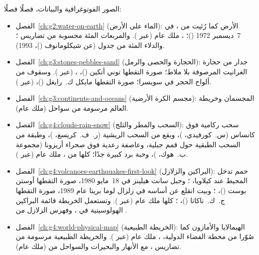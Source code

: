 \bigskip
\noindent الصور الفوتوغرافية والبيانات، فصلًا فصلًا:
\begin{itemize}\small
  \item الفصل~\ref{ch:g2:water-on-earth} (الماء على الأرض): الأرض كما رُئيت من ، في 7~ديسمبر 1972 ()؛ ، ملك عام (عبر ). والمربعات المئة محسوبة من تضاريس ؛ والدلاء المئة من جدول  (عن شيكلومانوف ()، 1993).
  \item الفصل~\ref{ch:g3:stones-pebbles-sand} (الحجارة والحصى والرمل): جدار من حجارة الغرانيت المرصوفة بلا ملاط؛ صورة التقطها توني أتكين ()، ،  (عبر ). وسقوف من ألواح الحجر في سويسرا؛ صورة التقطها مايكل ك.~رايغل ()،  (عبر ).
  \item الفصل~\ref{ch:g3:continents-and-oceans} (مجسم الكرة الأرضية): المجسمان وخريطة العالم مرسومة من سواحل  (ملك عام).
  \item الفصل~\ref{ch:g4:clouds-rain-snow} (السحب والمطر والثلج): سحب ركامية فوق كانساس (س.~كورفيدي، )، وبقع من السحب الريشية (ر.~ف.~كريسغ، )، وطبقة من السحب الطبقية حول قمم جبلية، وعاصفة رعدية فوق صحراء أريزونا (مجموعة ب.~هوك، )، وحبة برد كبيرة جدًا؛ كلها من ، ملك عام (عبر ).
  \item الفصل~\ref{ch:g4:volcanoes-earthquakes-first-look} (البراكين والزلازل): حمم تدخل المحيط عند كيلاويا، ؛ وجبل سانت هيلينز في 18~مايو 1980، صورة التقطها أوستن بوست ()، ؛ وبيت انقلع عن أساسه في زلزال لوما بريتا عام 1989، صورة التقطها ج.~ك.~ناكاتا ()، ؛ كلها ملك عام (عبر ). وتستعمل الخريطة قائمة البراكين الهولوسينية في ، وفهرس الزلازل من .
  \item الفصل~\ref{ch:g4:world-physical-map} (الخريطة الطبيعية): الهيمالايا والأمازون كما صُوّرا من محطة الفضاء الدولية، ، ملك عام (عبر ). والخريطة الطبيعية مرسومة من تضاريس ، مع الأنهار والبحيرات والسواحل من  (ملك عام).

\end{itemize}
